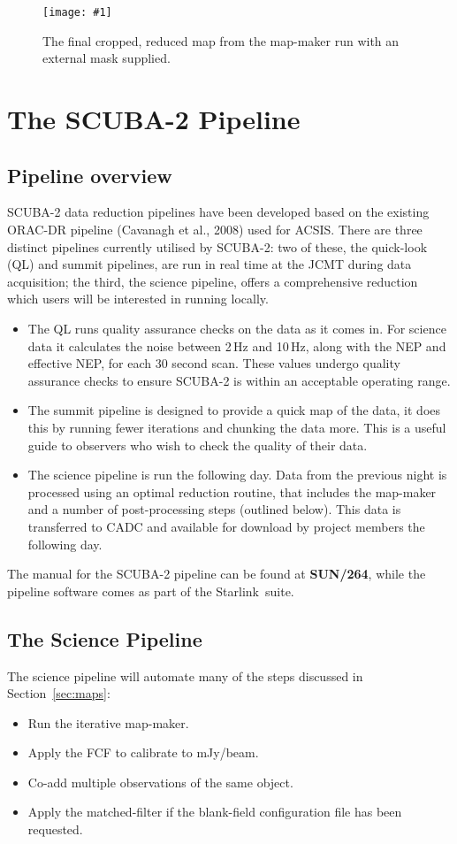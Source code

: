 \documentclass[twoside,11pt]{article}
\newcommand{\htmladdnormallink}[2]{#1}
\newcommand{\htmladdimg}[1]{}
\newcommand{\htmlref}[2]{#1}
\newcommand{\latexhtml}[2]{#1}
\newcommand{\xref}[3]{#1}
\newcommand{\xlabel}[1]{}
\renewcommand{\_}{\texttt{\symbol{95}}}
\newcommand{\starlink}{\htmladdnormallink{Starlink}{http://starlink.jach.hawaii.edu}}
\newcommand{\pipelinesun}{\xref{\textbf{SUN/264}}{sun264}{}}
\newcommand{\myfig}[5]{
  \begin{figure}#2
    \centering\texttt{[image: \#1]}
    \typeout{#1.eps inserted on page \arabic{page}}
    \caption{\label{#4}\small #5}
  \end{figure}
}
\newcommand{\myfig}[5]{
    \label{#4} \htmladdimg{#1.png}\\
    \\
    Figure: #5\\
  }
\newcommand{\cref}[3]{\latexhtml{#1~\ref{#2}}{\htmlref{#3}{#2}}}
\begin{document}
\myfig{sc21_gal12_crop}{[t!]}{width=0.8\hsize}{fig:crop_map}{
The final cropped, reduced map from the map-maker run with
an external mask supplied.}


\clearpage
\section{\xlabel{pipeline}The SCUBA-2 Pipeline}
\label{sec:pipe}
\subsection{\xlabel{pl_overview}Pipeline overview}

SCUBA-2 data reduction pipelines have been developed based on the
existing ORAC-DR pipeline (Cavanagh et al., 2008\cite{oracdr}) used
for ACSIS. There are three distinct pipelines currently utilised by
SCUBA-2: two of these, the quick-look (QL) and summit pipelines, are
run in real time at the JCMT during data acquisition; the third, the science
pipeline, offers a comprehensive reduction which users will be
interested in running locally.

\begin{itemize}
\item The QL runs quality assurance checks on the data as it comes in.
For science data it calculates the noise between 2\,Hz and 10\,Hz,
along with the NEP and effective NEP, for each 30 second scan. These
values undergo quality assurance checks to ensure SCUBA-2 is within
an acceptable operating range.
\item The summit pipeline is designed to provide a quick map of the
data, it does this by running fewer iterations and chunking the data
more. This is a useful guide to observers who wish to check the
quality of their data.
\item The science pipeline is run the following day. Data from the
previous night is processed using an optimal reduction routine, that
includes the map-maker and a number of post-processing steps (outlined
below). This data is transferred to CADC and available for download
by project members the following day.
\end{itemize}

The manual for the SCUBA-2 pipeline can be found at \pipelinesun,
while the pipeline software comes as part of the \starlink\ suite.


\subsection{\xlabel{science_pl}The Science Pipeline}
The science pipeline will automate many of the steps discussed in
\cref{Section}{sec:maps}{Reducing your data}:
\vspace{-0.3cm}
\begin{itemize}\itemsep-0.3em
\item Run the iterative map-maker.
\item Apply the FCF to calibrate to mJy/beam.
\item Co-add multiple observations of the same object.
\item Apply the matched-filter if the blank-field configuration file
has been requested.
\end{itemize}
\end{document}

